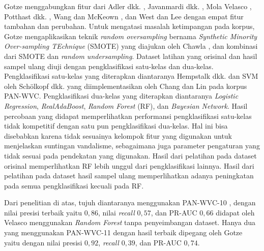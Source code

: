 Gotze \cite{gotze2014advanced} menggabungkan fitur dari Adler dkk.
\cite{adler2011wikipedia}, Javanmardi dkk. \cite{javanmardi2011vandalism}, Mola
Velasco \cite{mola2012wikipedia}, Potthast dkk. \cite{potthast2008automatic},
Wang dan McKeown \cite{wang2010got}, dan West dan Lee
\cite{west2011multilingual} dengan empat fitur tambahan dan perubahan.
Untuk mengatasi masalah ketimpangan pada korpus, Gotze
\cite{gotze2014advanced}
mengaplikasikan teknik
\textit{random oversampling}
bernama
\textit{Synthetic Minority Over-sampling TEchnique} (SMOTE)
yang diajukan oleh Chawla
\cite{chawla2002smote},
dan kombinasi dari SMOTE dan
\textit{random undersampling}.
Dataset latihan yang orisinal dan hasil sampel ulang diuji dengan
pengklasifikasi satu-kelas dan dua-kelas.
Pengklasifikasi satu-kelas yang diterapkan diantaranya Hempstalk dkk.
\cite{hempstalk2008one}
dan SVM oleh Schölkopf dkk.
\cite{scholkopf1999support}
yang diimplementasikan oleh Chang dan Lin
\cite{chang2011libsvm}
pada korpus PAN-WVC.
Pengklasifikasi dua-kelas yang diterapkan diantaranya
\textit{Logistic Regression},
\textit{RealAdaBoost},
\textit{Random Forest} (RF), dan
\textit{Bayesian Network}.
Hasil percobaan yang didapat memperlihatkan performansi pengklasifikasi
satu-kelas tidak kompetitif dengan satu pun pengklasifikasi dua-kelas.
Hal ini bisa disebabkan karena tidak sesuainya kelompok fitur yang digunakan
untuk menjelaskan suntingan vandalisme, sebagaimana juga parameter pengaturan
yang tidak sesuai pada pendekatan yang digunakan.
Hasil dari pelatihan pada dataset orisinal memperlihatkan RF
lebih unggul dari pengklasifikasi lainnya.
Hasil dari pelatihan pada dataset hasil sampel ulang memperlihatkan adanya
peningkatan pada semua pengklasifikasi kecuali pada RF.



Dari penelitian di atas, tujuh diantaranya menggunakan PAN-WVC-10
\cite{adler2010detecting}
\cite{adler2011wikipedia}
\cite{gotze2014advanced}
\cite{harpalani2011language}
\cite{mola2012wikipedia}
\cite{wang2010got}
\cite{west2011multilingual},
dengan nilai presisi terbaik yaitu $0,86$, nilai \textit{recall} $0,57$, dan
PR-AUC $0,66$ didapat oleh Velasco menggunakan \textit{Random Forest} tanpa
penyeimbangan dataset.
Hanya dua yang menggunakan PAN-WVC-11 \cite{gotze2014advanced}
\cite{west2011multilingual} dengan hasil terbaik dipegang oleh Gotze yaitu
dengan nilai presisi $0,92$, \textit{recall} $0,39$, dan PR-AUC $0,74$.
